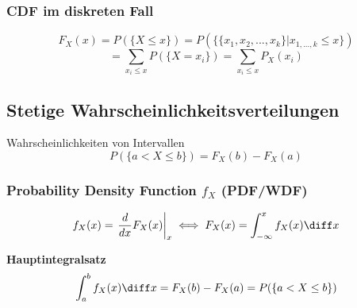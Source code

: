 \begin{sectionbox}
    \subsubsection{CDF im diskreten Fall}
    \begin{equation*}
        F_X(x)=P(\{X \le x\}) = P(\{\{x_1,x_2,...,x_k\} | x_{1,...,k} \le x\})
    \end{equation*}
    \begin{equation*}
        =\sum_{x_i\le x}P(\{X=x_i\})=\sum_{x_i\le x} P_X(x_i)
    \end{equation*}
\end{sectionbox}

\subsection{Stetige Wahrscheinlichkeitsverteilungen}
\begin{emphbox}
    Wahrscheinlichkeiten von Intervallen
    \begin{equation*}
        P(\{a < X \le b\})=F_X(b) - F_X(a)
    \end{equation*}
\end{emphbox}

\subsubsection{Probability Density Function $f_X$ (PDF/WDF)}
\begin{sectionbox}
    \begin{emphbox}
        \begin{equation*}
            f_X(x)=\left.\dfrac{d}{dx}F_X(x)\right|_x \; \Longleftrightarrow \; F_X(x) = \int_{-\infty}^x f_X(x)\diff x
        \end{equation*}
    \end{emphbox}

    \textbf{Hauptintegralsatz}
    \begin{equation*}
        \int_a^bf_X(x)\diff x = F_X(b) - F_X(a) = P(\{a < X \le b\})
    \end{equation*}

\end{sectionbox}

